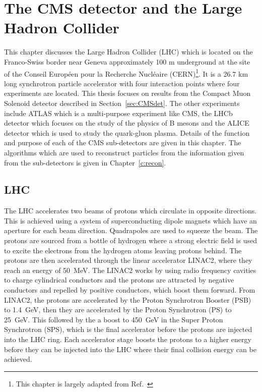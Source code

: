 \chapter{The CMS detector and the Large Hadron Collider}
\label{c:det}
This chapter discusses the Large Hadron Collider (LHC) which is located on the Franco-Swiss border near Geneva approximately 100 m underground at the site of the Conseil Europ\'{e}en pour la Recherche Nucl\'{e}aire (CERN)\footnote{This chapter is largely adapted from Ref.~\cite{iopdetector}}. It is a 26.7 km long synchrotron particle accelerator with four interaction points where four experiments are located. This thesis focuses on results from the Compact Muon Solenoid detector described in Section~\ref{sec:CMSdet}. The other experiments include ATLAS which is a multi-purpose experiment like CMS, the LHCb detector which focuses on the study of the physics of B mesons and the ALICE detector which is used to study the quark-gluon plasma. Details of the function and purpose of each of the CMS sub-detectors are given in this chapter. The algorithms which are used to reconstruct particles from the information given from the sub-detectors is given in Chapter~\ref{c:recon}.

\section{LHC}

The LHC accelerates two beams of protons which circulate in opposite directions.
This is achieved using a system of superconducting dipole magnets which have an aperture for each beam direction. Quadrapoles are used to squeeze the beam.
The protons are sourced from a bottle of hydrogen where a strong electric field is used to excite the electrons from the hydrogen atoms leaving protons behind. The protons are then accelerated through the linear accelerator LINAC2, where they reach an energy of 50~MeV. The LINAC2 works by using radio frequency cavities to charge cylindrical conductors and the protons are attracted by negative conductors and repelled by positive conductors, which boost them forward. From LINAC2, the protons are accelerated by the Proton Synchrotron Booster (PSB) to 1.4~GeV, then they are accelerated by the Proton Synchrotron (PS) to 25~GeV. This followed by the a boost to 450~GeV in the Super Proton Synchrotron (SPS), which is the final accelerator before the protons are injected into the LHC ring. Each accelerator stage boosts the protons to a higher energy before they can be injected into the LHC where their final collision energy can be achieved.


